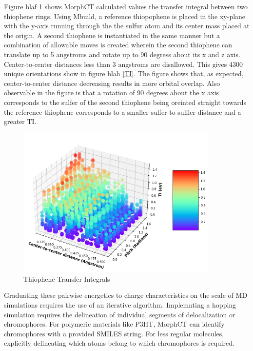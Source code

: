 Figure blaf \ref{fig:TI} shows MorphCT calculated values the transfer integral between two thiophene
rings. Using Mbuild, a reference thiopophene is placed in the xy-plane with the y-axis running through the 
the sulfur atom and its center mass placed at the origin. A second thiophene is instantiated in the same manner but a
combination of allowable moves is created wherein the second thiophene can translate up to 5 angstroms 
and rotate up to 90 degress about its x and z axis. Center-to-center distances less than 3 angstroms are disallowed. 
This gives 4300 unique orientations show in figure blah \ref{TI}. The figure shows that, as expected,
center-to-center distance decreasing results in more orbital overlap. Also observable in the figure is that
a rotation of 90 degrees about the x axis corresponds to the sulfer of the second thiophene being oreinted
straight towards the reference thiophene corresponds to a smaller sulfer-to-sulfler distance and a greater TI. 


\begin{figure}
  \center
  \includegraphics[width=10cm]{figures/transfer_integral_plot.png}
  \caption{Thiophene Transfer Integrals}
  \label{fig:TI}
\end{figure}

\newline \indent Graduating these pairwise energetics to charge characteristics on the scale of MD simulations
requires the use of an iterative algorithm. Implemnting a hopping simulation requires the delineation of
individual segments of delocalization or chromophores. For polymeric materials like P3HT, MorphCT
can identify chromophores with a provided SMILES string. For less regular molecules, explicitly delineating
which atoms belong to which chromophores is required. 

